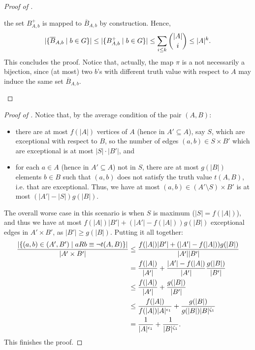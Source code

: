 \begin{proof}[Proof of ]
\begin{enumerate}
                the set $B^+_{A,b}$ is mapped to $\overline{B}_{A,b}$ by construction.
                Hence,
                \[
                    | \{ \overline{B}_{A,b} \mid b \in G \} | \leq
                    | \{ B^+_{A,b} \mid b \in G \} | \leq
                    \sum_{i \leq k} \binom{|A|}{i} \leq |A|^k.
                \]
                This concludes the proof.
                Notice that, actually, the map $\pi$ is a not necessarily a bijection, since (at most) two $b$'s with
                different truth value with respect to $A$ may induce the same set $\overline{B}_{A,b}$. \qedhere
        \end{enumerate}
    \end{proof}

    \begin{proof}[Proof of ]
        Notice that, by the average condition of the pair $(A,B)$:
        \begin{itemize}
            \item there are at most $f(|A|)$ vertices of $A$ (hence in $A' \subseteq A$), say $S$, which are exceptional
                with respect to $B$, so the number of edges $(a,b) \in S \times B'$ which are exceptional is at most
                $|S| \cdot |B'|$, and
            \item for each $a \in A$ (hence in $A' \subseteq A$) not in $S$, there are at most $g(|B|)$ elements
                $b \in B$ such that $(a,b)$ does not satisfy the truth value $t(A,B)$, i.e. that are exceptional.
                Thus, we have at most $(a,b) \in (A' \setminus S) \times B'$ is at most $(|A'| - |S|) g(|B|)$.
        \end{itemize}
        The overall worse case in this scenario is when $S$ is maximum ($|S| = f(|A|)$), and thus we have at most
        $f(|A|) |B'| + (|A'| - f(|A|)) g(|B|)$ exceptional edges in $A' \times B'$, as $|B'| \geq g(|B|)$.
        Putting it all together:
        \[
            \begin{split}
                \frac{|\{ (a,b) \in (A',B') \mid a R b \equiv \neg t(A,B) \}|}{|A' \times B'|}
                    &\leq \frac{f(|A|) |B'| + (|A'| - f(|A|)) g(|B|)}{|A'| |B'|} \\
                    &= \frac{f(|A|)}{|A'|} + \frac{|A'| - f(|A|)}{|A'|} \frac{g(|B|)}{|B'|} \\
                    &\leq \frac{f(|A|)}{|A'|} + \frac{g(|B|)}{|B'|} \\
                    &\leq \frac{f(|A|)}{f(|A|) |A|^{\epsilon_1}} + \frac{g(|B|)}{g(|B|) |B|^{\zeta_1}} \\
                    &= \frac{1}{|A|^{\epsilon_1}} + \frac{1}{|B|^{\zeta_1}}.
            \end{split}
        \]
        This finishes the proof.
    \end{proof}

